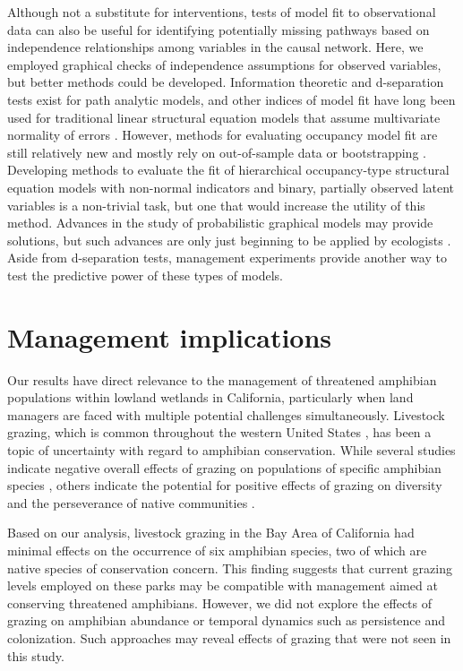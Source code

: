 Although not a substitute for interventions, tests of model fit to
observational data can also be useful for identifying potentially
missing pathways based on independence relationships among variables in
the causal network. Here, we employed graphical checks of independence
assumptions for observed variables, but better methods could be
developed. Information theoretic and d-separation tests exist for path
analytic models, and other indices of model fit have long been used for
traditional linear structural equation models that assume multivariate
normality of errors \citep{Grace2006, Shipley2013}. However, methods for
evaluating occupancy model fit are still relatively new and mostly rely
on out-of-sample data \citep{Zipkin2012} or bootstrapping \citep{MacKenzie2004}. Developing methods to evaluate the fit of hierarchical
occupancy-type structural equation models with non-normal indicators and
binary, partially observed latent variables is a non-trivial task, but
one that would increase the utility of this method. Advances in the
study of probabilistic graphical models may provide solutions, but such
advances are only just beginning to be applied by ecologists \citep{Koller2009, Grace2012}.
Aside from d-separation tests,
management experiments provide another way to test the predictive power
of these types of models.

\section{Management implications}

Our results have direct relevance to the management of threatened
amphibian populations within lowland wetlands in California,
particularly when land managers are faced with multiple potential
challenges simultaneously. Livestock grazing, which is common throughout
the western United States \citep{fleischner1994}, has been a topic of
uncertainty with regard to amphibian conservation. While several studies
indicate negative overall effects of grazing on populations of specific
amphibian species \citep{Knutson2004, Schmutzer2008}, others
indicate the potential for positive effects of grazing on diversity and
the perseverance of native communities \citep{Marty2005}.

Based on our analysis, livestock grazing in the Bay Area of California
had minimal effects on the occurrence of six amphibian species, two of
which are native species of conservation concern. This finding suggests
that current grazing levels employed on these parks may be compatible
with management aimed at conserving threatened amphibians. However, we
did not explore the effects of grazing on amphibian abundance or
temporal dynamics such as persistence and colonization. Such approaches
may reveal effects of grazing that were not seen in this study.

